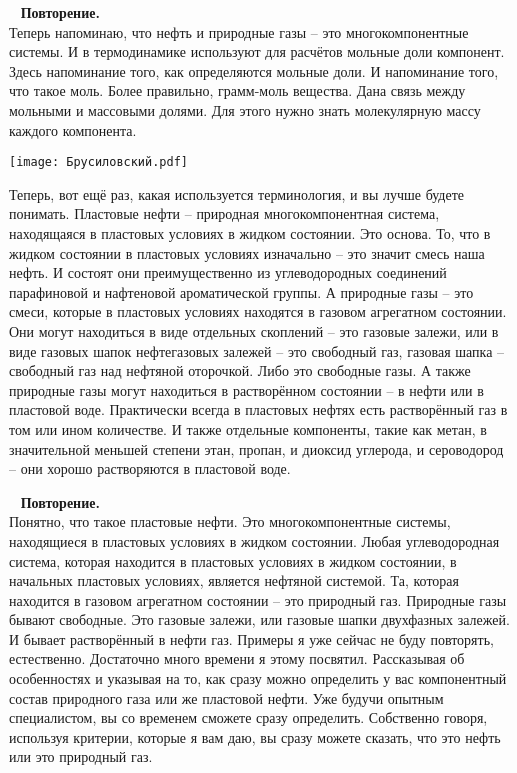 \documentclass[main.tex]{subfiles}
\begin{document}
\ \newline
\textbf{Повторение.}\\
Теперь напоминаю, что нефть и природные газы -- это многокомпонентные системы.
И в термодинамике используют для расчётов мольные доли компонент.
Здесь напоминание того, как определяются мольные доли.
И напоминание того, что такое моль.
Более правильно, грамм-моль вещества.
Дана связь между мольными и массовыми долями.
Для этого нужно знать молекулярную массу каждого компонента.

\begin{center}
\texttt{[image: Брусиловский.pdf]}
\end{center}

Теперь, вот ещё раз, какая используется терминология, и вы лучше будете понимать.
Пластовые нефти -- природная многокомпонентная система, находящаяся в пластовых условиях в жидком состоянии.
Это основа.
То, что в жидком состоянии в пластовых условиях изначально -- это значит смесь наша нефть.
И состоят они преимущественно из углеводородных соединений парафиновой и нафтеновой ароматической группы.
А природные газы -- это смеси, которые в пластовых условиях находятся в газовом агрегатном состоянии.
Они могут находиться в виде отдельных скоплений -- это газовые залежи, или в виде газовых шапок нефтегазовых залежей -- это свободный газ, газовая шапка -- свободный газ над нефтяной оторочкой.
Либо это свободные газы.
А также природные газы могут находиться в растворённом состоянии -- в нефти или в пластовой воде.
Практически всегда в пластовых нефтях есть растворённый газ в том или ином количестве.
И также отдельные компоненты, такие как метан, в значительной меньшей степени этан, пропан,
и диоксид углерода, и сероводород -- они хорошо растворяются в пластовой воде.

\ \newline
\textbf{Повторение.}\\
Понятно, что такое пластовые нефти.
Это многокомпонентные системы, находящиеся в пластовых условиях в жидком состоянии.
Любая углеводородная система, которая находится в пластовых условиях в жидком состоянии, в начальных пластовых условиях, является нефтяной системой.
Та, которая находится в газовом агрегатном состоянии -- это природный газ.
Природные газы бывают свободные.
Это газовые залежи, или газовые шапки двухфазных залежей.
И бывает растворённый в нефти газ.
Примеры я уже сейчас не буду повторять, естественно.
Достаточно много времени я этому посвятил.
Рассказывая об особенностях и указывая на то, как сразу можно определить у вас компонентный состав природного газа или же пластовой нефти.
Уже будучи опытным специалистом, вы со временем сможете сразу определить.
Собственно говоря, используя критерии, которые я вам даю, вы сразу можете сказать, что это нефть или это природный газ.
\end{document}
